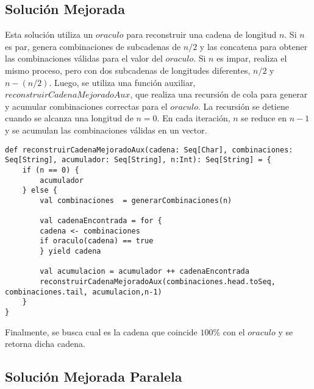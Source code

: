 \documentclass[conference]{IEEEtran}
\begin{document}
\subsection{\textbf{Solución Mejorada}}

Esta solución utiliza un $oraculo$ para reconstruir una cadena de longitud $n$. Si $n$ es par, genera combinaciones de subcadenas de $n/2$ y las concatena para obtener las combinaciones válidas para el valor del $oraculo$. Si $n$ es impar, realiza el mismo proceso, pero con dos subcadenas de longitudes diferentes, $n/2$ y $n-(n/2)$. Luego, se utiliza una función auxiliar, $reconstruirCadenaMejoradoAux$, que realiza una recursión de cola para generar y acumular combinaciones correctas para el $oraculo$. La recursión se detiene cuando se alcanza una longitud de $n=0$. En cada iteración, $n$ se reduce en $n-1$ y se acumulan las combinaciones válidas en un vector.

\newpage
\begin{lstlisting}
def reconstruirCadenaMejoradoAux(cadena: Seq[Char], combinaciones: Seq[String], acumulador: Seq[String], n:Int): Seq[String] = {
    if (n == 0) {
        acumulador
    } else {
        val combinaciones  = generarCombinaciones(n)
                
        val cadenaEncontrada = for {
        cadena <- combinaciones
        if oraculo(cadena) == true
        } yield cadena
            
        val acumulacion = acumulador ++ cadenaEncontrada
        reconstruirCadenaMejoradoAux(combinaciones.head.toSeq, combinaciones.tail, acumulacion,n-1)
    }
}

\end{lstlisting}


Finalmente, se busca cual es la cadena que coincide $100$\% con el $oraculo$ y se retorna dicha cadena.


\subsection{\textbf{Solución Mejorada Paralela}}
\end{document}
